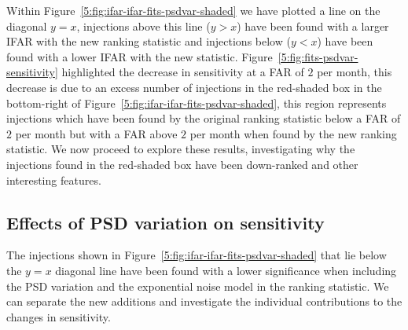 %
Within Figure~\ref{5:fig:ifar-ifar-fits-psdvar-shaded} we have plotted a line on the diagonal $y=x$, injections above this line ($y > x$) have been found with a larger IFAR with the new ranking statistic and injections below ($y < x$) have been found with a lower IFAR with the new statistic. Figure~\ref{5:fig:fits-psdvar-sensitivity} highlighted the decrease in sensitivity at a FAR of $2$ per month, this decrease is due to an excess number of injections in the red-shaded box in the bottom-right of Figure~\ref{5:fig:ifar-ifar-fits-psdvar-shaded}, this region represents injections which have been found by the original ranking statistic below a FAR of $2$ per month but with a FAR above $2$ per month when found by the new ranking statistic. We now proceed to explore these results, investigating why the injections found in the red-shaded box have been down-ranked and other interesting features.

\subsection{\label{5:sec:ignoring-psdvar}Effects of PSD variation on sensitivity}

The injections shown in Figure~\ref{5:fig:ifar-ifar-fits-psdvar-shaded} that lie below the $y = x$ diagonal line have been found with a lower significance when including the PSD variation and the exponential noise model in the ranking statistic. We can separate the new additions and investigate the individual contributions to the changes in sensitivity.

